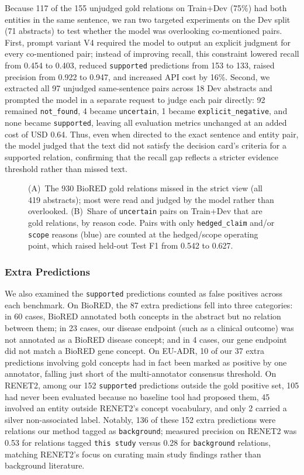 \documentclass[preprint,10pt,letterpaper]{elsarticle}
\newcommand{\st}[1]{\texttt{#1}}             %
\begin{document}
Because 117 of the 155 unjudged gold relations on Train+Dev (75\%) had both entities in the same sentence, we ran two targeted experiments on the Dev split (71 abstracts) to test whether the model was overlooking co-mentioned pairs. First, prompt variant V4 required the model to output an explicit judgment for every co-mentioned pair; instead of improving recall, this constraint lowered recall from 0.454 to 0.403, reduced \st{supported} predictions from 153 to 133, raised precision from 0.922 to 0.947, and increased API cost by 16\%. Second, we extracted all 97 unjudged same-sentence pairs across 18 Dev abstracts and prompted the model in a separate request to judge each pair directly: 92 remained \st{not\_found}, 4 became \st{uncertain}, 1 became \st{explicit\_negative}, and none became \st{supported}, leaving all evaluation metrics unchanged at an added cost of USD 0.64. Thus, even when directed to the exact sentence and entity pair, the model judged that the text did not satisfy the decision card's criteria for a supported relation, confirming that the recall gap reflects a stricter evidence threshold rather than missed text.

\begin{figure}[!htbp]
\centering
\resizebox{\linewidth}{!}{}
\caption{(A)~The 930 BioRED gold relations missed in the strict view (all 419 abstracts); most were read and judged by the model rather than overlooked. (B)~Share of \st{uncertain} pairs on Train+Dev that are gold relations, by reason code. Pairs with only \st{hedged\_claim} and/or \st{scope} reasons (blue) are counted at the hedged/scope operating point, which raised held-out Test F1 from 0.542 to 0.627.}
\label{fig:recall}
\end{figure}

\subsubsection{Extra Predictions}
We also examined the \st{supported} predictions counted as false positives across each benchmark. On BioRED, the 87 extra predictions fell into three categories: in 60 cases, BioRED annotated both concepts in the abstract but no relation between them; in 23 cases, our disease endpoint (such as a clinical outcome) was not annotated as a BioRED disease concept; and in 4 cases, our gene endpoint did not match a BioRED gene concept. On EU-ADR, 10 of our 37 extra predictions involving gold concepts had in fact been marked as positive by one annotator, falling just short of the multi-annotator consensus threshold. On RENET2, among our 152 \st{supported} predictions outside the gold positive set, 105 had never been evaluated because no baseline tool had proposed them, 45 involved an entity outside RENET2's concept vocabulary, and only 2 carried a silver non-associated label. Notably, 136 of these 152 extra predictions were relations our method tagged as \st{background}; measured precision on RENET2 was 0.53 for relations tagged \st{this study} versus 0.28 for \st{background} relations, matching RENET2's focus on curating main study findings rather than background literature.
\end{document}
